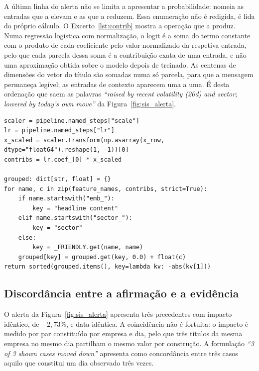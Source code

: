 A última linha do alerta não se limita a apresentar a probabilidade: nomeia as entradas que a
elevam e as que a reduzem. Essa enumeração não é redigida, é lida do próprio cálculo. O
Excerto~\ref{lst:contrib} mostra a operação que a produz. Numa regressão logística com
normalização, o logit é a soma do termo constante com o produto de cada coeficiente pelo valor
normalizado da respetiva entrada, pelo que cada parcela dessa soma é a contribuição exata de uma
entrada, e não uma aproximação obtida sobre o modelo depois de treinado. As centenas de
dimensões do vetor do título são somadas numa só parcela, para que a mensagem permaneça legível;
as entradas de contexto aparecem uma a uma. É desta ordenação que saem as palavras
\emph{``raised by recent volatility (20d) and sector; lowered by today's own move''} da
Figura~\ref{fig:sis_alerta}.

\begin{lstlisting}[caption={[A repartição aditiva que a mensagem enuncia]A repartição que a
última linha do alerta enuncia. O produto do vetor de coeficientes pelo vetor normalizado dá a
contribuição de cada entrada para o logit; as parcelas são agrupadas e ordenadas por módulo
decrescente. A explicação apresentada ao utilizador é esta soma, e não um segundo modelo
ajustado sobre o primeiro. Omite-se a documentação interna da função.}, label={lst:contrib}, float=htbp]
scaler = pipeline.named_steps["scale"]
lr = pipeline.named_steps["lr"]
x_scaled = scaler.transform(np.asarray(x_row, dtype="float64").reshape(1, -1))[0]
contribs = lr.coef_[0] * x_scaled

grouped: dict[str, float] = {}
for name, c in zip(feature_names, contribs, strict=True):
    if name.startswith("emb_"):
        key = "headline content"
    elif name.startswith("sector_"):
        key = "sector"
    else:
        key = _FRIENDLY.get(name, name)
    grouped[key] = grouped.get(key, 0.0) + float(c)
return sorted(grouped.items(), key=lambda kv: -abs(kv[1]))
\end{lstlisting}

\subsection{Discordância entre a afirmação e a evidência}

O alerta da Figura~\ref{fig:sis_alerta} apresenta três precedentes com impacto idêntico, de
$-2{,}73\%$, e data idêntica. A coincidência não é fortuita: o impacto é medido por par
constituído por empresa e dia, pelo que três títulos da mesma empresa no mesmo dia partilham o
mesmo valor por construção. A formulação \emph{``3 of 3 shown cases moved down''} apresenta como
concordância entre três casos aquilo que constitui um dia observado três vezes.

